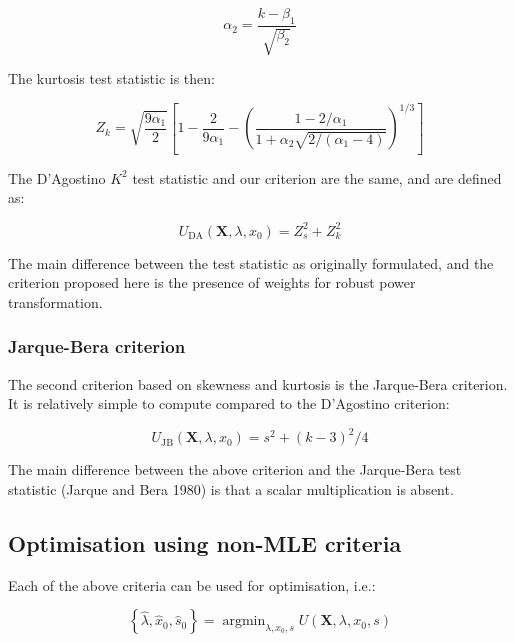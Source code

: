 \documentclass[
  a4paper,
]{article}
\DeclareMathOperator*{\argmin}{argmin}
\begin{document}
\begin{equation}
\alpha_2 = \frac{k - \beta_1}{\sqrt{\beta_2}}
\end{equation}

The kurtosis test statistic is then:

\begin{equation}
Z_k = \sqrt{\frac{9 \alpha_1}{2}} \left[ 1 - \frac{2}{9 \alpha_1} - \left(\frac{1 - 2 / \alpha_1}{1 + \alpha_2 \sqrt{2 / \left(\alpha_1 - 4 \right)}} \right)^{1 / 3}  \right]
\end{equation}

The D'Agostino \(K^2\) test statistic and our criterion are the same,
and are defined as:

\begin{equation}
U_{\text{DA}} \left(\mathbf{X}, \lambda, x_0 \right) = Z_s^2 + Z_k^2
\end{equation}

The main difference between the test statistic as originally formulated,
and the criterion proposed here is the presence of weights for robust
power transformation.

\subsubsection{Jarque-Bera criterion}\label{jarque-bera-criterion}

The second criterion based on skewness and kurtosis is the Jarque-Bera
criterion. It is relatively simple to compute compared to the D'Agostino
criterion:

\begin{equation}
U_{\text{JB}} \left(\mathbf{X}, \lambda, x_0 \right) = s^2 + \left(k - 3\right)^2 / 4
\end{equation}

The main difference between the above criterion and the Jarque-Bera test
statistic (Jarque and Bera 1980) is that a scalar multiplication is
absent.

\subsection{Optimisation using non-MLE
criteria}\label{optimisation-using-non-mle-criteria}

Each of the above criteria can be used for optimisation, i.e.:

\begin{equation}
\left\{ \hat{\lambda}, \hat{x}_0, \hat{s}_0 \right\} = \argmin_{\lambda, x_0, s} U\left(\mathbf{X}, \lambda, x_0, s \right)
\end{equation}
\end{document}

